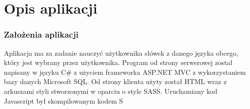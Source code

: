 {\let\cleardoublepage\relax \chapter{Opis aplikacji}}
\label{cha:main}

\subsection{Założenia aplikacji}

Aplikacja ma za zadanie nauczyć użytkownika słówek z danego języka obcego, który jest wybrany przez użytkownika. Program od strony serwerowej został napisany w języku C\# z użyciem frameworka ASP.NET MVC z wykorzystaniem bazy danych Microsoft SQL. Od strony klienta użyty został HTML wraz z arkuszami styli stworzonymi w oparciu o style SASS. Uruchamiany kod Javascript był skompilowanym kodem S %

